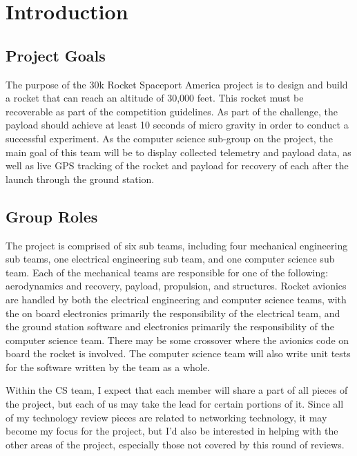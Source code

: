 \documentclass[onecolumn, draftclsnofoot,10pt, compsoc]{IEEEtran}
\begin{document}
\section{Introduction}

\subsection{Project Goals}
The purpose of the 30k Rocket Spaceport America project is to design and build a rocket that can reach an altitude of 30,000 feet. 
This rocket must be recoverable as part of the competition guidelines.
As part of the challenge, the payload should achieve at least 10 seconds of micro gravity in order to conduct a successful experiment.
As the computer science sub-group on the project, the main goal of this team will be to display collected telemetry and payload data, as well as live GPS tracking of the rocket and payload for recovery of each after the launch through the ground station. 

\subsection{Group Roles}
The project is comprised of six sub teams, including four mechanical engineering sub teams, one electrical engineering sub team, and one computer science sub team.
Each of the mechanical teams are responsible for one of the following: aerodynamics and recovery, payload, propulsion, and structures.
Rocket avionics are handled by both the electrical engineering and computer science teams, with the on board electronics primarily the responsibility of the electrical team, and the ground station software and electronics primarily the responsibility of the computer science team. 
There may be some crossover where the avionics code on board the rocket is involved.
The computer science team will also write unit tests for the software written by the team as a whole.


Within the CS team, I expect that each member will share a part of all pieces of the project, but each of us may take the lead for certain portions of it.
Since all of my technology review pieces are related to networking technology, it may become my focus for the project, but I'd also be interested in helping with the other areas of the project, especially those not covered by this round of reviews.


\end{document}

